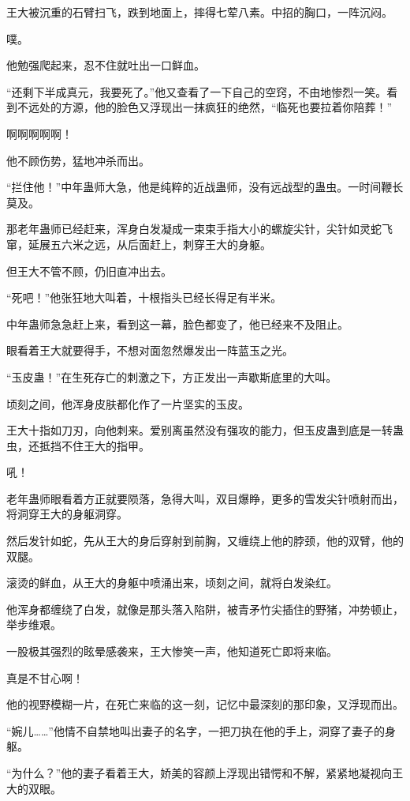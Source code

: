 \begin{this_body}
王大被沉重的石臂扫飞，跌到地面上，摔得七荤八素。中招的胸口，一阵沉闷。

噗。

他勉强爬起来，忍不住就吐出一口鲜血。

“还剩下半成真元，我要死了。”他又查看了一下自己的空窍，不由地惨烈一笑。看到不远处的方源，他的脸色又浮现出一抹疯狂的绝然，“临死也要拉着你陪葬！”

啊啊啊啊啊！

他不顾伤势，猛地冲杀而出。

“拦住他！”中年蛊师大急，他是纯粹的近战蛊师，没有远战型的蛊虫。一时间鞭长莫及。

那老年蛊师已经赶来，浑身白发凝成一束束手指大小的螺旋尖针，尖针如灵蛇飞窜，延展五六米之远，从后面赶上，刺穿王大的身躯。

但王大不管不顾，仍旧直冲出去。

“死吧！”他张狂地大叫着，十根指头已经长得足有半米。

中年蛊师急急赶上来，看到这一幕，脸色都变了，他已经来不及阻止。

眼看着王大就要得手，不想对面忽然爆发出一阵蓝玉之光。

“玉皮蛊！”在生死存亡的刺激之下，方正发出一声歇斯底里的大叫。

顷刻之间，他浑身皮肤都化作了一片坚实的玉皮。

王大十指如刀刃，向他刺来。爱别离虽然没有强攻的能力，但玉皮蛊到底是一转蛊虫，还抵挡不住王大的指甲。

吼！

老年蛊师眼看着方正就要陨落，急得大叫，双目爆睁，更多的雪发尖针喷射而出，将洞穿王大的身躯洞穿。

然后发针如蛇，先从王大的身后穿射到前胸，又缠绕上他的脖颈，他的双臂，他的双腿。

滚烫的鲜血，从王大的身躯中喷涌出来，顷刻之间，就将白发染红。

他浑身都缠绕了白发，就像是那头落入陷阱，被青矛竹尖插住的野猪，冲势顿止，举步维艰。

一股极其强烈的眩晕感袭来，王大惨笑一声，他知道死亡即将来临。

真是不甘心啊！

他的视野模糊一片，在死亡来临的这一刻，记忆中最深刻的那印象，又浮现而出。

“婉儿……”他情不自禁地叫出妻子的名字，一把刀执在他的手上，洞穿了妻子的身躯。

“为什么？”他的妻子看着王大，娇美的容颜上浮现出错愕和不解，紧紧地凝视向王大的双眼。


\end{this_body}
